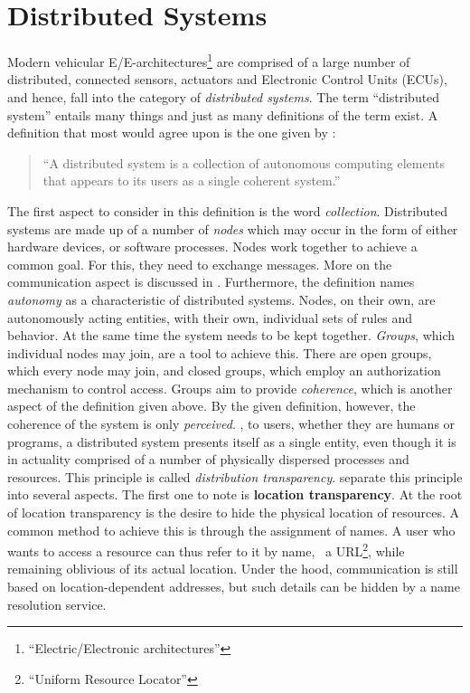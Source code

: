 \section{Distributed Systems}
Modern vehicular E/E-architectures\footnote{``Electric/Electronic architectures''} are comprised of a large number of distributed, connected sensors, actuators and Electronic Control Units (ECUs), and hence, fall into the category of \emph{distributed systems}. The term ``distributed system'' entails many things and just as many definitions of the term exist. A definition that most would agree upon is the one given by \citeauthor{tanenbaum2017distributed} \cite{tanenbaum2017distributed}:
\begin{quote}
``A distributed system is a collection of autonomous computing elements that appears to its users as a single coherent system.''
\end{quote}
The first aspect to consider in this definition is the word \emph{collection}. Distributed systems are made up of a number of \emph{nodes} which may occur in the form of either hardware devices, or software processes. Nodes work together to achieve a common goal. For this, they need to exchange messages. More on the communication aspect is discussed in . Furthermore, the definition names \emph{autonomy} as a characteristic of distributed systems. Nodes, on their own, are autonomously acting entities, with their own, individual sets of rules and behavior. At the same time the system needs to be kept together. \emph{Groups}, which individual nodes may join, are a tool to achieve this. There are open groups, which every node may join, and closed groups, which employ an authorization mechanism to control access.
Groups aim to provide \emph{coherence}, which is another aspect of the definition given above. By the given definition, however, the coherence of the system is only \emph{perceived}. \Ie , to users, whether they are humans or programs, a distributed system presents itself as a single entity, even though it is in actuality comprised of a number of physically dispersed processes and resources. This principle is called \emph{distribution transparency}. \citeauthor*{tanenbaum2017distributed} \cite{tanenbaum2017distributed} separate this principle into several aspects. The first one to note is \textbf{location transparency}. At the root of location transparency is the desire to hide the physical location of resources. A common method to achieve this is through the assignment of names. A user who wants to access a resource can thus refer to it by name, \eg\ a URL\footnote{``Uniform Resource Locator''}, while remaining oblivious of its actual location. Under the hood, communication is still based on location-dependent addresses, but such details can be hidden by a name resolution service.
